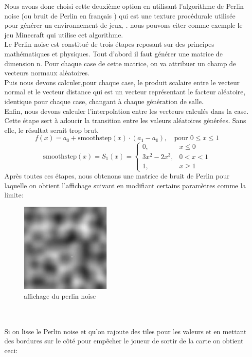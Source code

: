 \documentclass[a4paper,11pt]{article}
\begin{document}
Nous avons donc choisi cette deuxième option en utilisant l'algorithme de Perlin noise (ou bruit de Perlin en français ) qui est une texture procédurale  utilisée pour générer un environnement de jeux, . nous pouvons citer comme exemple le jeu Minecraft qui utilise cet algorithme.\\
Le Perlin noise est constitué de trois étapes reposant sur des principes mathématiques et physiques. Tout d'abord il faut générer une matrice de dimension n. Pour chaque case de cette matrice, on va attribuer un champ de vecteurs normaux aléatoires.\\
Puis nous devons calculer,pour chaque case, le produit scalaire entre le vecteur normal et le vecteur distance qui est un vecteur représentant le facteur aléatoire, identique pour chaque case, changant à chaque génération de salle.\\
Enfin, nous devons calculer l'interpolation entre les vecteurs calculés dans la case. Cette étape sert à adoucir la transition entre les valeurs aléatoires générées. Sans elle, le résultat serait trop brut.\\
\[
f(x) = a_{0} + \text{smoothstep}(x) \cdot (a_{1} - a_{0}), \quad \text{pour } 0 \leq x \leq 1
\]
\begin{equation*}
\text{smoothstep}(x) =
S_1(x) =
\begin{cases} 
0, & x \leq 0 \\ 
3x^2 - 2x^3, & 0 < x < 1 \\ 
1, & x \geq 1
\end{cases}
\end{equation*}
Après toutes ces étapes, nous obtenons une matrice de bruit de Perlin pour laquelle on obtient l'affichage suivant en modifiant certains paramètres comme la limite:\
\begin{figure}[ht]
\centering
\includegraphics[width=0.4\textwidth]{./img/perlin.jpg}
\caption{affichage du perlin noise}
\label{fig:affichage perlin}
\end{figure}
\\\\
\newpage
Si on lisse le Perlin noise et qu'on rajoute des tiles pour les valeurs et en mettant des bordures sur le côté pour empêcher le joueur de sortir de la carte on obtient ceci:\\
\end{document}
